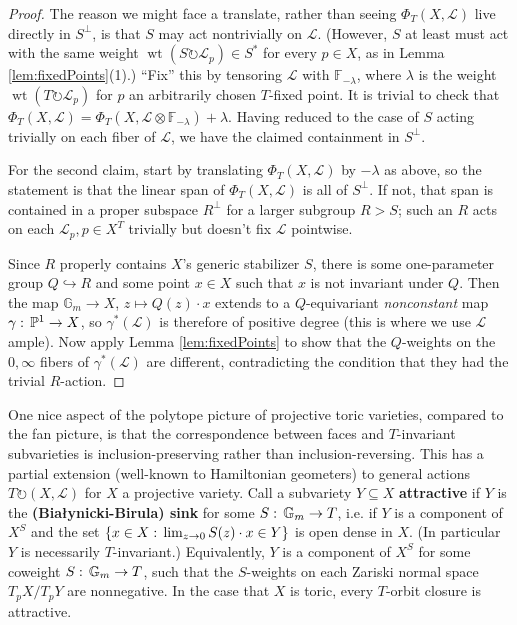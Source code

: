 \documentclass[11pt]{amsart}
\theoremstyle{definition}
\DeclareMathOperator{\wt}{wt}
\newcommand{\PP}{\mathbb{P}}
\newcommand\defn[1]{{\bf #1}}
\newcommand\FF{{\mathbb F}}
\newcommand\tensor\otimes
\newcommand\calL{{\mathcal L}}
\newcommand\Gm{{\mathbb G}_m}
\newcommand\into\hookrightarrow
\newcommand\actson\circlearrowright
\renewcommand{\colon}{\mathrel{:}}
\renewcommand{\colon}{:\mkern\thinmuskip}
\begin{document}
\begin{proof}
  The reason we might face a translate,
  rather than seeing $\Phi_T(X,\calL)$ live directly in $S^\perp$,  
  is that $S$ may act nontrivially on $\calL$. (However, $S$ at least
  must act with the same weight $\wt(S \actson \calL_p) \in S^*$ for
  every $p\in X$, as in Lemma \ref{lem:fixedPoints}(1).)
  ``Fix'' this by tensoring $\calL$ with $\FF_{-\lambda}$,
  where $\lambda$ is the weight $\wt(T\actson \calL_p)$ for $p$ an
  arbitrarily chosen $T$-fixed point.  It is trivial to check that
  $\Phi_T(X,\calL) = \Phi_T(X,\calL\tensor \FF_{-\lambda}) + \lambda$.
  Having reduced to the case of $S$ acting trivially on each fiber of $\calL$,
  we have the claimed containment in $S^\perp$.

  For the second claim, start by translating $\Phi_T(X,\calL)$ by $-\lambda$
  as above, so the statement is that the linear span of $\Phi_T(X,\calL)$
  is all of $S^\perp$. If not, that span is contained in a proper
  subspace $R^\perp$ for a larger subgroup $R > S$; such an $R$ acts on
  each $\calL_p, p\in X^T$ trivially but doesn't fix $\calL$ pointwise.

  Since $R$ properly contains $X$'s generic stabilizer $S$, there is
  some one-parameter group $Q \into R$ and some point $x\in X$ such
  that $x$ is not invariant under $Q$. Then the map
  $\Gm \to X$, $z\mapsto Q(z)\cdot x$ extends to a $Q$-equivariant
  {\em nonconstant} map
  $\gamma\colon \PP^1 \to X$, so $\gamma^*(\calL)$ is therefore
  of positive degree (this is where we use $\calL$ ample).
  Now apply Lemma \ref{lem:fixedPoints} to show that the $Q$-weights on
  the $0,\infty$ fibers of $\gamma^*(\calL)$ are different, contradicting
  the condition that they had the trivial $R$-action.
\end{proof}

One nice aspect of the polytope picture of projective toric varieties,
compared to the fan picture, is that the correspondence between faces and
$T$-invariant subvarieties is inclusion-preserving rather than
inclusion-reversing. This has a partial extension (well-known to 
Hamiltonian geometers) to general actions
$T \actson (X,\calL)$ for $X$ a projective variety.
Call a subvariety $Y\subseteq X$ \defn{attractive}
if $Y$ is the \defn{(Bia\l ynicki-Birula) sink} for some $S\colon \Gm\to T$,
i.e. if $Y$ is a component of $X^S$ and the set
$ \{x\in X\colon \lim_{z\to 0} S(z)\cdot x \in Y\} $ is open dense in $X$.
(In particular $Y$ is necessarily $T$-invariant.)
Equivalently, $Y$ is a component of $X^S$ for some coweight
$S\colon \Gm\to T$, such that the $S$-weights
on each Zariski normal space $T_p X/T_pY$ are nonnegative.
In the case that $X$ is toric, every $T$-orbit closure is attractive.
\end{document}
